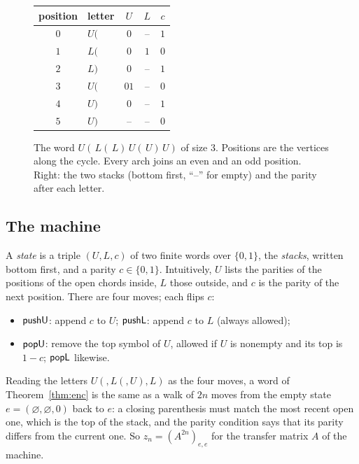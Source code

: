 \begin{figure}[htb]
\centering
{}\hspace{1.2cm}%
{\small\begin{tabular}[c]{clccc}
\toprule
position & letter & $U$ & $L$ & $c$\\
\midrule
$0$ & $U($ & $0$ & -- & $1$\\
$1$ & $L($ & $0$ & $1$ & $0$\\
$2$ & $L)$ & $0$ & -- & $1$\\
$3$ & $U($ & $01$ & -- & $0$\\
$4$ & $U)$ & $0$ & -- & $1$\\
$5$ & $U)$ & -- & -- & $0$\\
\bottomrule
\end{tabular}}
\caption{The word $U(\,L(\,L)\,U(\,U)\,U)$ of size $3$. Positions are the vertices along the cycle. Every arch joins
an even and an odd position. Right: the two stacks (bottom first, ``--'' for empty) and the parity after each letter.}
\label{fig:word}
\end{figure}

\subsection{The machine}

A \emph{state} is a triple $(U,L,c)$ of two finite words over $\{0,1\}$, the \emph{stacks}, written bottom first,
and a parity $c\in\{0,1\}$. Intuitively, $U$ lists the parities of the positions of the open chords inside, $L$ those
outside, and $c$ is the parity of the next position. There are four moves; each flips $c$:
\begin{itemize}
\item $\mathsf{pushU}$: append $c$ to $U$; $\mathsf{pushL}$: append $c$ to $L$ (always allowed);
\item $\mathsf{popU}$: remove the top symbol of $U$, allowed if $U$ is nonempty and its top is $1-c$; $\mathsf{popL}$ likewise.
\end{itemize}
Reading the letters $U(,L(,U),L)$ as the four moves, a word of Theorem~\ref{thm:enc} is the same as a walk of $2n$
moves from the empty state $e=(\varnothing,\varnothing,0)$ back to $e$: a closing parenthesis must match the most
recent open one, which is the top of the stack, and the parity condition says that its parity differs from the
current one. So $z_n=(A^{2n})_{e,e}$ for the transfer matrix $A$ of the machine.

